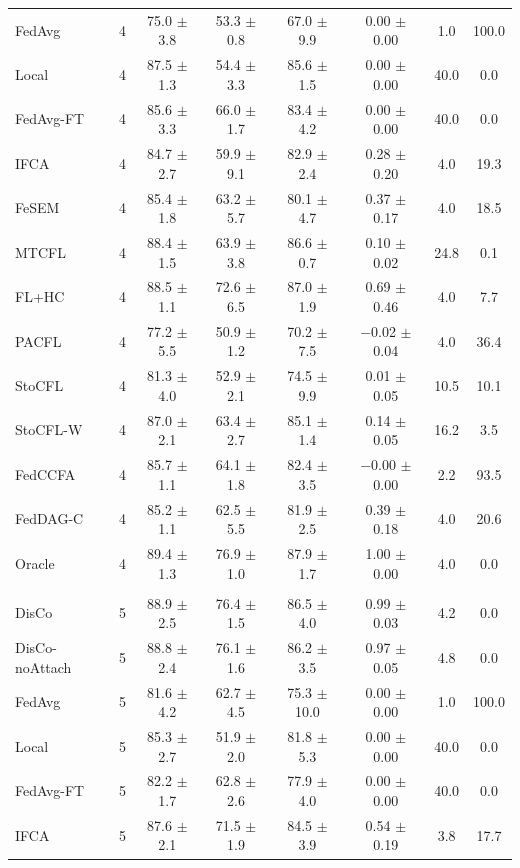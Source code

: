 {\begin{tabular}{l r c c c c c c}
FedAvg & 4 & 75.0 $\pm$ 3.8 & 53.3 $\pm$ 0.8 & 67.0 $\pm$ 9.9 & 0.00 $\pm$ 0.00 & 1.0 & 100.0 \\
Local & 4 & 87.5 $\pm$ 1.3 & 54.4 $\pm$ 3.3 & 85.6 $\pm$ 1.5 & 0.00 $\pm$ 0.00 & 40.0 & 0.0 \\
FedAvg-FT & 4 & 85.6 $\pm$ 3.3 & 66.0 $\pm$ 1.7 & 83.4 $\pm$ 4.2 & 0.00 $\pm$ 0.00 & 40.0 & 0.0 \\
IFCA & 4 & 84.7 $\pm$ 2.7 & 59.9 $\pm$ 9.1 & 82.9 $\pm$ 2.4 & 0.28 $\pm$ 0.20 & 4.0 & 19.3 \\
FeSEM & 4 & 85.4 $\pm$ 1.8 & 63.2 $\pm$ 5.7 & 80.1 $\pm$ 4.7 & 0.37 $\pm$ 0.17 & 4.0 & 18.5 \\
MTCFL & 4 & 88.4 $\pm$ 1.5 & 63.9 $\pm$ 3.8 & 86.6 $\pm$ 0.7 & 0.10 $\pm$ 0.02 & 24.8 & 0.1 \\
FL+HC & 4 & 88.5 $\pm$ 1.1 & 72.6 $\pm$ 6.5 & 87.0 $\pm$ 1.9 & 0.69 $\pm$ 0.46 & 4.0 & 7.7 \\
PACFL & 4 & 77.2 $\pm$ 5.5 & 50.9 $\pm$ 1.2 & 70.2 $\pm$ 7.5 & $-$0.02 $\pm$ 0.04 & 4.0 & 36.4 \\
StoCFL & 4 & 81.3 $\pm$ 4.0 & 52.9 $\pm$ 2.1 & 74.5 $\pm$ 9.9 & 0.01 $\pm$ 0.05 & 10.5 & 10.1 \\
StoCFL-W & 4 & 87.0 $\pm$ 2.1 & 63.4 $\pm$ 2.7 & 85.1 $\pm$ 1.4 & 0.14 $\pm$ 0.05 & 16.2 & 3.5 \\
FedCCFA & 4 & 85.7 $\pm$ 1.1 & 64.1 $\pm$ 1.8 & 82.4 $\pm$ 3.5 & $-$0.00 $\pm$ 0.00 & 2.2 & 93.5 \\
FedDAG-C & 4 & 85.2 $\pm$ 1.1 & 62.5 $\pm$ 5.5 & 81.9 $\pm$ 2.5 & 0.39 $\pm$ 0.18 & 4.0 & 20.6 \\
Oracle & 4 & 89.4 $\pm$ 1.3 & 76.9 $\pm$ 1.0 & 87.9 $\pm$ 1.7 & 1.00 $\pm$ 0.00 & 4.0 & 0.0 \\
\addlinespace
\multicolumn{8}{l}{\textit{Rotation + QS}} \\
DisCo & 5 & 88.9 $\pm$ 2.5 & 76.4 $\pm$ 1.5 & 86.5 $\pm$ 4.0 & 0.99 $\pm$ 0.03 & 4.2 & 0.0 \\
DisCo-noAttach & 5 & 88.8 $\pm$ 2.4 & 76.1 $\pm$ 1.6 & 86.2 $\pm$ 3.5 & 0.97 $\pm$ 0.05 & 4.8 & 0.0 \\
FedAvg & 5 & 81.6 $\pm$ 4.2 & 62.7 $\pm$ 4.5 & 75.3 $\pm$ 10.0 & 0.00 $\pm$ 0.00 & 1.0 & 100.0 \\
Local & 5 & 85.3 $\pm$ 2.7 & 51.9 $\pm$ 2.0 & 81.8 $\pm$ 5.3 & 0.00 $\pm$ 0.00 & 40.0 & 0.0 \\
FedAvg-FT & 5 & 82.2 $\pm$ 1.7 & 62.8 $\pm$ 2.6 & 77.9 $\pm$ 4.0 & 0.00 $\pm$ 0.00 & 40.0 & 0.0 \\
IFCA & 5 & 87.6 $\pm$ 2.1 & 71.5 $\pm$ 1.9 & 84.5 $\pm$ 3.9 & 0.54 $\pm$ 0.19 & 3.8 & 17.7 \\

\end{tabular}}
